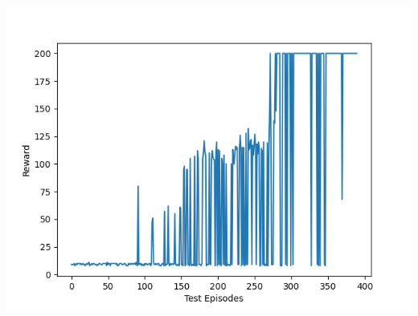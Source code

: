 \documentclass[12pt]{article}
\begin{document}
\begin{tcolorbox}[height=45em, width=\textwidth]
\begin{center}
\begin{minipage}{0.32\textwidth}
            \includegraphics[width=\textwidth]{outputs/plots/sim_50/testing/test_rewards.png}
        \end{minipage}
        
        \vspace{1em}
        

\end{center}
\end{tcolorbox}
\end{document}

